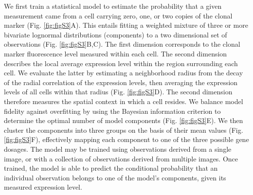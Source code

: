 We first train a statistical model to estimate the probability that a given measurement came from a cell carrying zero, one, or two copies of the clonal marker (Fig. \ref{fig:figS3}A). This entails fitting a weighted mixture of three or more bivariate lognormal distributions (components) to a two dimensional set of observations (Fig. \ref{fig:figS3}B,C). The first dimension corresponds to the clonal marker fluorescence level measured within each cell. The second dimension describes the local average expression level within the region surrounding each cell. We evaluate the latter by estimating a neighborhood radius from the decay of the radial correlation of the expression levels, then averaging the expression levels of all cells within that radius (Fig. \ref{fig:figS3}D). The second dimension therefore measures the spatial context in which a cell resides. We balance model fidelity against overfitting by using the Bayesian information criterion to determine the optimal number of model components (Fig. \ref{fig:figS3}E). We then cluster the components into three groups on the basis of their mean values (Fig. \ref{fig:figS3}F), effectively mapping each component to one of the three possible gene dosages. The model may be trained using observations derived from a single image, or with a collection of observations derived from multiple images. Once trained, the model is able to predict the conditional probability that an individual observation belongs to one of the model's components, given its measured expression level.

